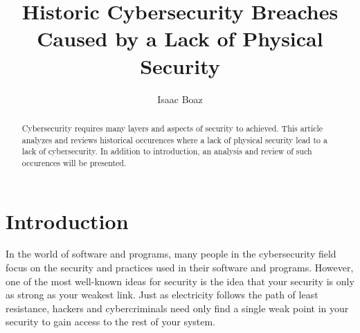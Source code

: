 \documentclass[acmlarge]{acmart}
\begin{document}

\title{Historic Cybersecurity Breaches Caused by a Lack of Physical Security}

\author{Isaac Boaz}

\renewcommand{\shortauthors}{Boaz}

\begin{abstract}
  Cybersecurity requires many layers and aspects of security to achieved.
  This article analyzes and reviews historical occurences where a lack of
  physical security lead to a lack of cybersecurity. In addition to introduction,
  an analysis and review of such occurences will be presented.
\end{abstract}


\maketitle

\section{Introduction}
In the world of software and programs, many people in the cybersecurity
field focus on the security and practices used in their software and programs.
However, one of the most well-known ideas for security is the idea that
your security is only as strong as your weakest link. Just as electricity
follows the path of least resistance, hackers and cybercriminals need only
find a single weak point in your security to gain access to the rest of
your system.
\end{document}
